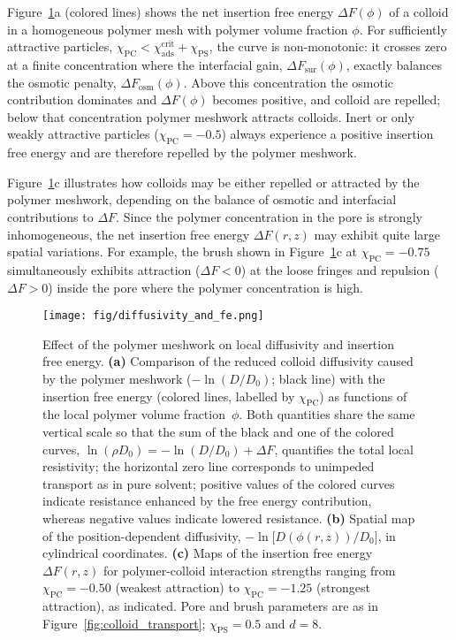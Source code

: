 \documentclass[12pt, a4paper]{article}
\begin{document}
Figure~\ref{fig:D_fe_map}a (colored lines) shows the net insertion free energy $\Delta F(\phi)$ of a colloid in a homogeneous polymer mesh with polymer volume fraction $\phi$.
For sufficiently attractive particles, $\chi_{\text{PC}} < \chi_{\text{ads}}^{\text{crit}} + \chi_{\text{PS}}$, the curve is non-monotonic: it crosses zero at a finite concentration where the interfacial gain, $\Delta F_{\text{sur}}(\phi)$, exactly balances the osmotic penalty, $\Delta F_{\text{osm}}(\phi)$.
Above this concentration the osmotic contribution dominates and $\Delta F(\phi)$ becomes positive, and colloid are repelled; below that concentration polymer meshwork attracts colloids.
Inert or only weakly attractive particles ($\chi_{\text{PC}} = -0.5$) always experience a positive insertion free energy and are therefore repelled by the polymer meshwork.
 
Figure~\ref{fig:D_fe_map}c illustrates how colloids may be either repelled or attracted by the polymer meshwork, depending on the balance of osmotic and interfacial contributions to $\Delta F$.
Since the polymer concentration in the pore is strongly inhomogeneous, the net insertion free energy $\Delta F(r,z)$ may exhibit quite large spatial variations.
For example, the brush shown in Figure~\ref{fig:D_fe_map}c at $\chi_{\text{PC}}=-0.75$ simultaneously exhibits attraction ($\Delta F<0$) at the loose fringes and repulsion ($\Delta F>0$) inside the pore where the polymer concentration is high.

\begin{figure}
    \centering
    \centerline{\texttt{[image: fig/diffusivity\_and\_fe.png]}}
    \caption{%
        Effect of the polymer meshwork on local diffusivity and insertion free energy.  
        \textbf{(a)}  Comparison of the reduced colloid diffusivity caused by the polymer meshwork ($-\ln(D/D_{0})$; black line) with the insertion free energy (colored lines, labelled by $\chi_{\text{PC}}$) as functions of the local polymer volume fraction~$\phi$.  
        Both quantities share the same vertical scale  
       so that the sum of the black and one of the colored curves,  $\ln(\rho D_{0}) = -\ln(D/D_{0}) + \Delta F$, quantifies the total local resistivity; the horizontal zero line corresponds to unimpeded transport as in pure solvent; positive values of the colored curves indicate resistance enhanced by the free energy contribution, whereas negative values indicate lowered resistance.
       \textbf{(b)}  Spatial map of the position-dependent diffusivity, $-\ln\bigl[D(\phi(r,z))/D_{0}\bigr]$, in cylindrical coordinates.  
        \textbf{(c)}  Maps of the insertion free energy $\Delta F(r,z)$ for polymer-colloid interaction strengths ranging from $\chi_{\text{PC}}=-0.50$ (weakest attraction) to $\chi_{\text{PC}}=-1.25$ (strongest attraction), as indicated.
        Pore and brush parameters are as in Figure~\ref{fig:colloid_transport}; $\chi_{\text{PS}}=0.5$ and $d=8$.
    }
    \label{fig:D_fe_map}
\end{figure}
\end{document}
